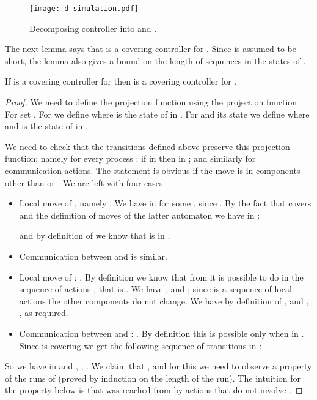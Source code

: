 \documentclass[10pt,a4paper]{article}
\newcommand{\anca}[1]{}
\begin{document}
\begin{figure}[tbp]
\texttt{[image: d-simulation.pdf]}
  \caption{Decomposing controller  into  and
    .}\label{fig:d-simulation}
\end{figure}

The next lemma says that  is a covering controller for
. Since  is assumed to be -short, the lemma also gives a
bound on the length of sequences in the states of . 
\begin{lemma}\label{lem:Dcovering}
  If  is a covering controller for  then  is a
  covering controller for .
\end{lemma}

\begin{proof}
  We need to define the projection function  using the projection
  function . For  set . For 
  we define  where  is the state of  in
  .  For  and its state  we define
   where  and  is the state of  in
  .

  We need to check that the transitions defined above preserve this
  projection function; namely for every process : if  in  then  in ; and
  similarly for communication actions.  The statement is obvious if
  the move is in components other than  or . We are left with
  four cases:
  \begin{itemize}
  \item Local move of , namely . We have
     in  for some , since
    .  By the fact that
     covers  and the definition of moves of the
    latter automaton we
    have in :
    
    and by definition of  we know that  is in .
  \item Communication between  and  is similar.
  \item Local move of : . By definition we
    know that from  it is possible to do in  the sequence of actions
    , that is . \anca{old: We have
    , 
    and ;} 
    We have
    , 
    and ; since  is a sequence of
    local -actions the other components do not change. We have
     by definition of , and ,
    , as required.  
  \item Communication between  and :
    . By
    definition this is possible only  when  in
    . Since  is covering we get the following
    sequence of transitions in : \anca{changed f in f' below,
      f' in g}
    
  \end{itemize}
  So we have  in  and
  , , .
  We claim that , and for this
   we need to observe a property of the runs of
   (proved by induction on the length of the run). The intuition
  for the property below is that  was reached from  by
  actions that do not involve . \anca{added ``The intuition..''}


\end{proof}
\end{document}
